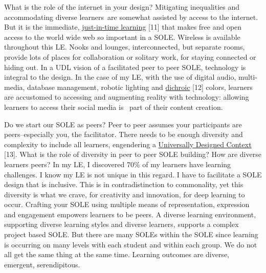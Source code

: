 What is the role of the internet in your design? Mitigating inequalities
and accommodating diverse learners~are somewhat assisted by access to
the internet. But it is the immediate,
\href{http://www.wordstream.com/blog/ws/2013/10/02/just-in-time-information-hacks}{just-in-time
learning} {[}11{]} that makes free and open access to the world wide web
so important in a SOLE. Wireless is available throughout this LE. Nooks
and lounges, interconnected, but separate rooms, provide lots of places
for collaboration or solitary work, for staying connected or hiding out.
In a UDL vision of a facilitated peer to peer SOLE, technology is
integral to the design. In the case of my LE, with the use of digital
audio, multi-media, database management, robotic lighting and
\href{http://en.wikipedia.org/wiki/Dichroic_filter}{dichroic} {[}12{]}
colors, learners are accustomed to accessing and augmenting reality with
technology: allowing learners to access their social media is~ part of
their content creation.

Do we start our SOLE as peers? Peer to peer assumes your participants
are peers--especially you, the facilitator. There needs to be enough
diversity and complexity to include all learners, engendering a
\href{http://www.cast.org/library/UDLguidelines/}{Universally Designed
Context} {[}13{]}. What is the role of diversity in peer to peer SOLE
building? How are diverse learners peers? In my LE, I discovered 70\% of
my learners have learning challenges. I know my LE is not unique in this
regard. I have to facilitate a SOLE design that is inclusive. This is in
contradistinction to commonality, yet this diversity is what we crave,
for creativity and innovation, for deep learning to occur. Crafting your
SOLE using multiple means of representation, expression and engagement
empowers learners to be peers. A diverse learning environment,
supporting diverse learning styles and diverse learners, supports a
complex project based SOLE. But there are many SOLEs within the SOLE
since learning is occurring on many levels with each student and within
each group. We do not all get the same thing at the same time. Learning
outcomes are diverse, emergent, serendipitous.

